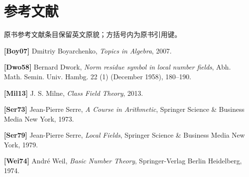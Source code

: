 \section*{参考文献}

原书参考文献条目保留英文原貌；方括号内为原书引用键。

\noindent\textbf{[Boy07]} Dmitriy Boyarchenko, \emph{Topics in Algebra}, 2007.\par\smallskip
\noindent\textbf{[Dwo58]} Bernard Dwork, \emph{Norm residue symbol in local number fields}, Abh. Math. Semin. Univ. Hambg. 22 (1) (December 1958), 180--190.\par\smallskip
\noindent\textbf{[Mil13]} J. S. Milne, \emph{Class Field Theory}, 2013.\par\smallskip
\noindent\textbf{[Ser73]} Jean-Pierre Serre, \emph{A Course in Arithmetic}, Springer Science \& Business Media New York, 1973.\par\smallskip
\noindent\textbf{[Ser79]} Jean-Pierre Serre, \emph{Local Fields}, Springer Science \& Business Media New York, 1979.\par\smallskip
\noindent\textbf{[Wei74]} André Weil, \emph{Basic Number Theory}, Springer-Verlag Berlin Heidelberg, 1974.\par\smallskip



